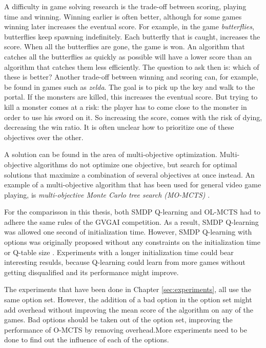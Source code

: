 A difficulty in game solving research is the trade-off between scoring, playing
time and winning. Winning earlier is often better, although for some games
winning later increases the eventual score. For example, in the game
\textit{butterflies}, butterflies keep spawning indefinitely. Each butterfly
that is caught, increases the score.  When all the butterflies are gone, the
game is won. An algorithm that catches all the butterflies as quickly as
possible will have a lower score than an algorithm that catches them less
efficiently. The question to ask then is: which of these is better? 
Another trade-off between winning and scoring can, for example, be found in
games such as \textit{zelda}. The goal is to pick up the key and walk to the
portal. If the monsters are killed, this increases the eventual score. But
trying to kill a monster comes at a risk: the player has to come close to the
monster in order to use his sword on it. So increasing the score, comes with the
risk of dying, decreasing the win ratio. It is often unclear how to prioritize
one of these objectives over the other. 

A solution can be found in the area of multi-objective optimization.
Multi-objective algorithms do not optimize one objective, but search for optimal
solutions that maximize a combination of several objectives at once instead. An
example of a multi-objective algorithm that has been used for general video game
playing, is \emph{multi-objective Monte Carlo tree search (MO-MCTS)} \cite{wang2012multi,
perez2015multi}.

For the comparisson in this thesis, both SMDP Q-learning and OL-MCTS had to
adhere the same rules of the GVGAI competition. As a result, SMDP Q-learning was
allowed one second of initialization time. However, SMDP Q-learning with options
was originally proposed without any constraints on the initialization time or
Q-table size \cite{sutton1999between}.  Experiments with a longer initialization
time could bear interesting resulds, because Q-learning could learn from more
games without getting disqualified and its performance might improve. 

The experiments that have been done in Chapter \ref{sec:experiments}, all use
the same option set. However, the addition of a bad option in the option set might add
overhead without improving the mean score of the algorithm on any of the games.
Bad options should be taken out of the option set, improving the performance of
O-MCTS by removing overhead.More experiments need to be done to find out the influence
of each of the options. 

